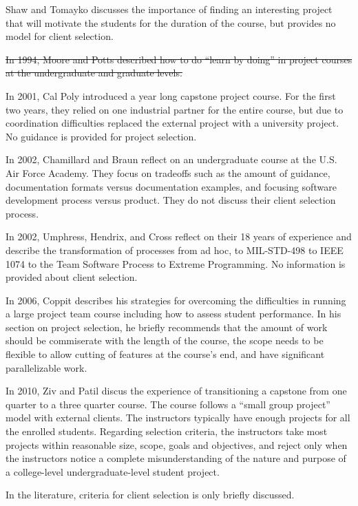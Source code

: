 \documentclass[conference]{IEEEtran}
\begin{document}
Shaw and Tomayko discusses the importance of finding an interesting project that will motivate the students for the duration of the course, but provides no model for client selection.

\sout{In 1994, Moore and Potts \cite{moore1994learning} described how to do ``learn by doing'' in project courses at the undergraduate and graduate levels.}

In 2001, Cal Poly \cite {Turner2001} introduced a year long capstone project course. For the first two years, they relied on one industrial partner for the entire course, but due to coordination difficulties replaced the external project with a university project. No guidance is provided for project selection.

In 2002, Chamillard and Braun \cite{Chamillard2002} reflect on an undergraduate course at the U.S. Air Force Academy. They focus on tradeoffs such as the amount of guidance, documentation formats versus documentation examples, and focusing software development process versus product. They do not discuss their client selection process.

In 2002, Umphress, Hendrix, and Cross \cite{Umphress2002} reflect on their 18 years of experience and describe the transformation of processes from ad hoc, to MIL-STD-498 to IEEE 1074 to the Team Software Process to Extreme Programming. No information is provided about client selection.

In 2006, Coppit \cite{coppit2006} describes his strategies for overcoming the difficulties in running a large project team course including how to assess student performance. In his section on project selection, he briefly recommends that the amount of work should be commiserate with the length of the course, the scope needs to be flexible to allow cutting of features at the course's end, and have significant parallelizable work. 

In 2010, Ziv and Patil \cite {ziv2010capstone} discus the experience of transitioning a capstone from one quarter to a three quarter course. The course follows a ``small group project'' model with external clients. The instructors typically have enough projects for all the enrolled students. Regarding selection criteria, the instructors take most projects within reasonable size, scope, goals and objectives, and reject only when the instructors notice a complete misunderstanding of the nature and purpose of a college-level undergraduate-level student project. 

In the literature, criteria for client selection is only briefly discussed. 
\end{document}
